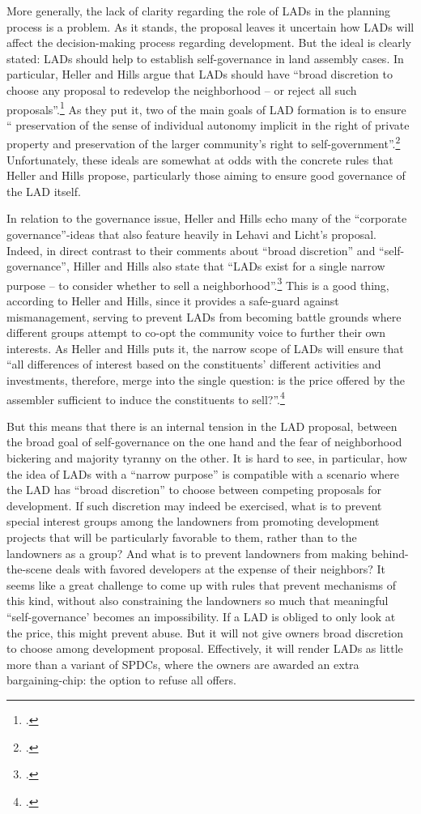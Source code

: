 More generally, the lack of clarity regarding the role of LADs in the planning process is a problem. As it stands, the proposal leaves it uncertain how LADs will affect the decision-making process regarding development. But the ideal is clearly stated: LADs should help to establish self-governance in land assembly cases. In particular, Heller and Hills argue that LADs should have ``broad discretion to choose any proposal to redevelop the neighborhood -- or reject all such proposals''.\footcite[See][1496]{heller08} As they put it, two of the main goals of LAD formation is to ensure `` preservation of the sense of individual autonomy implicit in the right of private property and preservation of the larger community's right to self-government''.\footcite[See][1498]{heller08} Unfortunately, these ideals are somewhat at odds with the concrete rules that Heller and Hills propose, particularly those aiming to ensure good governance of the LAD itself. 

In relation to the governance issue, Heller and Hills echo many of the ``corporate governance''-ideas that also feature heavily in Lehavi and Licht's proposal. Indeed, in direct contrast to their comments about ``broad discretion'' and ``self-governance'', Hiller and Hills also state that ``LADs exist for a single narrow purpose -- to consider whether to sell a neighborhood''.\footcite[See][1500]{heller08} This is a good thing, according to Heller and Hills, since it provides a safe-guard against mismanagement, serving to prevent LADs from becoming battle grounds where different groups attempt to co-opt the community voice to further their own interests. As Heller and Hills puts it, the narrow scope of LADs will ensure that ``all differences of interest based on the constituents' different activities and investments, therefore, merge into the single question: is the price offered by the assembler sufficient to induce the constituents to sell?''.\footcite[1500]{heller08}

But this means that there is an internal tension in the LAD proposal, between the broad goal of self-governance on the one hand and the fear of neighborhood bickering and majority tyranny on the other. It is hard to see, in particular, how the idea of LADs with a ``narrow purpose'' is compatible with a scenario where the LAD has ``broad discretion'' to choose between competing proposals for development. If such discretion may indeed be exercised, what is to prevent special interest groups among the landowners from promoting development projects that will be particularly favorable to them, rather than to the landowners as a group? And what is to prevent landowners from making behind-the-scene deals with favored developers at the expense of their neighbors? It seems like a great challenge to come up with rules that prevent mechanisms of this kind, without also constraining the landowners so much that meaningful ``self-governance' becomes an impossibility. If a LAD is obliged to only look at the price, this might prevent abuse. But it will not give owners broad discretion to choose among development proposal. Effectively, it will render LADs as little more than a variant of SPDCs, where the owners are awarded an extra bargaining-chip: the option to refuse all offers. 


